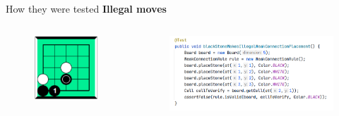 \documentclass{beamer}
\begin{document}
\begin{frame}[t]{How they were tested }
	\textbf{Illegal moves}
	\begin{columns}
		\begin{figure}[t]
			\includegraphics[scale=0.2]{images/illegal-move.png}
		\end{figure}
		\begin{figure}
			\includegraphics[scale=0.2]{images/test-illegal-weak.png}
		\end{figure}
		
	\end{columns}
	
	
	
	
\end{frame}
\end{document}
